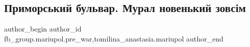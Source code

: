  
 
 
 
 

\subsection{Приморський бульвар. Мурал новенький зовсім}
\label{sec:11_02_2023.fb.fb_group.mariupol.pre_war.2.primorskii_bulvar__m}
 
\ifcmt
 author_begin
   author_id fb_group.mariupol.pre_war,tomilina_anastasia.mariupol
 author_end
\fi

